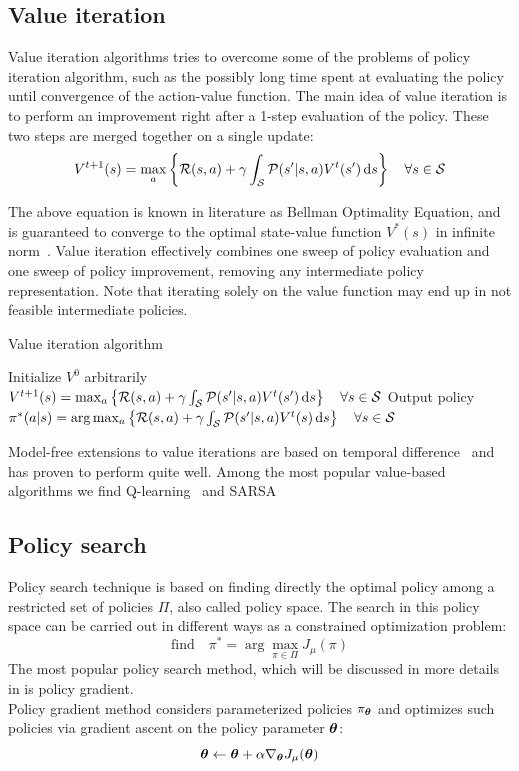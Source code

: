 \subsection{Value iteration}
Value iteration algorithms tries to overcome some of the problems of policy iteration algorithm, such as the possibly long time spent at evaluating the policy until convergence of the action-value function. The main idea of value iteration is to perform an improvement right after a 1-step evaluation of the policy. These two steps are merged together on a single update:
\[
V^{t+1}(s) = \max_a \left\{ \mathcal{R}(s,a) + \gamma\int_{\mathcal{S}} \mathcal{P}(s'|s,a)V^{t}(s')\, \textrm{d} s \right\}\quad\forall s \in \mathcal{S}
\] 

The above equation is known in literature as Bellman Optimality Equation, and is guaranteed to converge to the optimal state-value function $V^*(s)$ in infinite norm~\cite{BELLMAN1958228}. Value iteration effectively combines one sweep of policy evaluation and one sweep of policy improvement, removing any intermediate policy representation. Note that iterating solely on the value function may end up in not feasible intermediate policies.

\begin{algorithm}
\caption{Value iteration algorithm}
\begin{algorithmic}
\State Initialize $V^0$ arbitrarily
\State $V^{t+1}(s) = \max_a \left\{ \mathcal{R}(s,a) + \gamma\int_{\mathcal{S}} \mathcal{P}(s'|s,a)V^{t}(s')\, \textrm{d} s \right\}\quad\forall s \in \mathcal{S}$
\EndFor
\State Output policy $\pi^*(a|s)=\arg\max_a\left\{ \mathcal{R}(s,a) + \gamma\int_{\mathcal{S}}\mathcal{P}(s'|s,a)V^t(s) \, \textrm{d} s\right\}\quad\forall s\in\mathcal{S}$
\end{algorithmic}
\end{algorithm}

Model-free extensions to value iterations are based on temporal difference~\cite{Sutton1988} and has proven to perform quite well. Among the most popular value-based algorithms we find Q-learning~\cite{Watkins1992} and SARSA~\cite{sarsa}


\subsection{Policy search}
Policy search technique is based on finding directly the optimal policy among a restricted set of policies $\Pi$, also called policy space. The search in this policy space can be carried out in different ways as a constrained optimization problem:
\[
\textrm{find}\quad \pi^* = \arg\max_{\pi\in\Pi}J_\mu(\pi)
\]
The most popular policy search method, which will be discussed in more details in  is policy gradient.\\
Policy gradient method considers parameterized policies $\pi_{{\boldsymbol{\theta}}}$ and optimizes such policies via gradient ascent on the policy parameter ${\boldsymbol{\theta}}$:
\[
{\boldsymbol{\theta}} \gets {\boldsymbol{\theta}} + \alpha\nabla_{{\boldsymbol{\theta}}}J_\mu({\boldsymbol{\theta}})
\]

